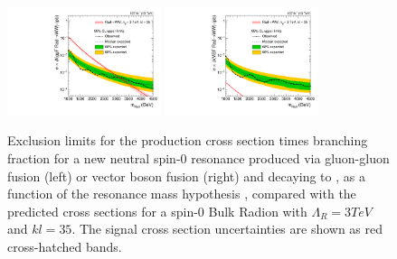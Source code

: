 \begin{figure}[htbp]
  \centering
  \includegraphics[width=0.4\textwidth]{fig/results/limits_RadToWW.pdf}
  \includegraphics[width=0.4\textwidth]{fig/results/limits_VBFRadToWW.pdf}
  \caption{
    Exclusion limits for the production cross section times branching fraction for a new neutral spin-0 resonance produced via gluon-gluon fusion (left) or vector boson fusion (right) and decaying to \WW, as a function of the resonance mass hypothesis \MX, compared with the predicted cross sections for a spin-0 Bulk Radion with $\Lambda_{R}=3\unit{TeV}$ and $kl=35$.
    The signal cross section uncertainties are shown as red cross-hatched bands.
  }
  \label{fig:limits_spin0}
\end{figure}

